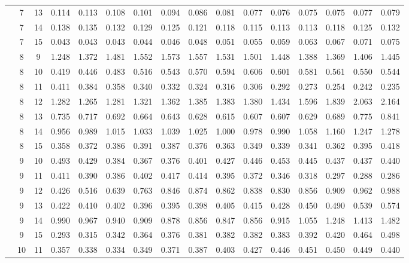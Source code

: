\documentclass[useAMS,usenatbib]{mn2e}
\begin{document}
\begin{longtable}{cccccccccccccccc}
 &  7 & 13 & 0.114 & 0.113 & 0.108 & 0.101 & 0.094 & 0.086 & 0.081 & 0.077 & 0.076 & 0.075 & 0.075 & 0.077 & 0.079 \\
 &  7 & 14 & 0.138 & 0.135 & 0.132 & 0.129 & 0.125 & 0.121 & 0.118 & 0.115 & 0.113 & 0.113 & 0.118 & 0.125 & 0.132 \\
 &  7 & 15 & 0.043 & 0.043 & 0.043 & 0.044 & 0.046 & 0.048 & 0.051 & 0.055 & 0.059 & 0.063 & 0.067 & 0.071 & 0.075 \\
 &  8 &  9 & 1.248 & 1.372 & 1.481 & 1.552 & 1.573 & 1.557 & 1.531 & 1.501 & 1.448 & 1.388 & 1.369 & 1.406 & 1.445 \\
 &  8 & 10 & 0.419 & 0.446 & 0.483 & 0.516 & 0.543 & 0.570 & 0.594 & 0.606 & 0.601 & 0.581 & 0.561 & 0.550 & 0.544 \\
 &  8 & 11 & 0.411 & 0.384 & 0.358 & 0.340 & 0.332 & 0.324 & 0.316 & 0.306 & 0.292 & 0.273 & 0.254 & 0.242 & 0.235 \\
 &  8 & 12 & 1.282 & 1.265 & 1.281 & 1.321 & 1.362 & 1.385 & 1.383 & 1.380 & 1.434 & 1.596 & 1.839 & 2.063 & 2.164 \\
 &  8 & 13 & 0.735 & 0.717 & 0.692 & 0.664 & 0.643 & 0.628 & 0.615 & 0.607 & 0.607 & 0.629 & 0.689 & 0.775 & 0.841 \\
 &  8 & 14 & 0.956 & 0.989 & 1.015 & 1.033 & 1.039 & 1.025 & 1.000 & 0.978 & 0.990 & 1.058 & 1.160 & 1.247 & 1.278 \\
 &  8 & 15 & 0.358 & 0.372 & 0.386 & 0.391 & 0.387 & 0.376 & 0.363 & 0.349 & 0.339 & 0.341 & 0.362 & 0.395 & 0.418 \\
 &  9 & 10 & 0.493 & 0.429 & 0.384 & 0.367 & 0.376 & 0.401 & 0.427 & 0.446 & 0.453 & 0.445 & 0.437 & 0.437 & 0.440 \\
 &  9 & 11 & 0.411 & 0.390 & 0.386 & 0.402 & 0.417 & 0.414 & 0.395 & 0.372 & 0.346 & 0.318 & 0.297 & 0.288 & 0.286 \\
 &  9 & 12 & 0.426 & 0.516 & 0.639 & 0.763 & 0.846 & 0.874 & 0.862 & 0.838 & 0.830 & 0.856 & 0.909 & 0.962 & 0.988 \\
 &  9 & 13 & 0.422 & 0.410 & 0.402 & 0.396 & 0.395 & 0.398 & 0.405 & 0.415 & 0.428 & 0.450 & 0.490 & 0.539 & 0.574 \\
 &  9 & 14 & 0.990 & 0.967 & 0.940 & 0.909 & 0.878 & 0.856 & 0.847 & 0.856 & 0.915 & 1.055 & 1.248 & 1.413 & 1.482 \\
 &  9 & 15 & 0.293 & 0.315 & 0.342 & 0.364 & 0.376 & 0.381 & 0.382 & 0.382 & 0.383 & 0.392 & 0.420 & 0.464 & 0.498 \\
 & 10 & 11 & 0.357 & 0.338 & 0.334 & 0.349 & 0.371 & 0.387 & 0.403 & 0.427 & 0.446 & 0.451 & 0.450 & 0.449 & 0.440 \\

\end{longtable}
\end{document}
